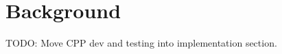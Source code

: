 \chapter{Background}

\label{Chapter2} 

TODO: Move CPP dev and testing into implementation section.

\newpage

\newpage

\newpage

\newpage

\newpage

\newpage

\newpage


